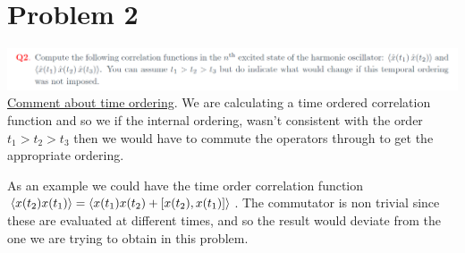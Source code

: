 \documentclass[a4paper,11pt]{article}
\begin{document}
\section*{Problem 2}
\hspace*{-1cm}\includegraphics[width=0.85\pagewidth]{2.png}
\underline{Comment about time ordering}. We are calculating a time ordered correlation function and so we if the internal ordering, wasn't consistent with the order $t_1>t_2>t_3$ then we would have to commute the operators through to get the appropriate ordering. 

As an example we could have the time order correlation function $\expval{x(t_2)x(t_1)}=\expval{x(t_1)x(t_2)+[x(t_2),x(t_1)]}$. The commutator is non trivial since these are evaluated at different times, and so the result would deviate from the one we are trying to obtain in this problem.
\end{document}
